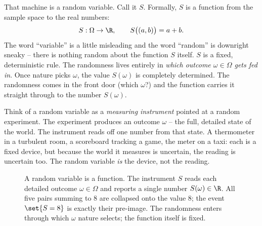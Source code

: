 That machine is a random variable. Call it $S$. Formally, $S$ is a function from the
sample space to the real numbers:
\[
  S : \Omega \to \R, \qquad S\big((a,b)\big) = a + b.
\]
The word ``variable'' is a little misleading and the word ``random'' is downright
sneaky -- there is nothing random about the function $S$ itself. $S$ is a fixed,
deterministic rule. The randomness lives entirely in \emph{which outcome
$\omega \in \Omega$ gets fed in}. Once nature picks $\omega$, the value $S(\omega)$ is
completely determined. The randomness comes in the front door (which $\omega$?) and
the function carries it straight through to the number $S(\omega)$.

\begin{intuitionbox}
Think of a random variable as a \emph{measuring instrument} pointed at a random
experiment. The experiment produces an outcome $\omega$ -- the full, detailed state of
the world. The instrument reads off one number from that state. A thermometer in a
turbulent room, a scoreboard tracking a game, the meter on a taxi: each is a fixed
device, but because the world it measures is uncertain, the reading is uncertain too.
The random variable \emph{is} the device, not the reading.
\end{intuitionbox}

\begin{figure}[H]
\centering
{}
\caption{A random variable is a function. The instrument $S$ reads each detailed
outcome $\omega\in\Omega$ and reports a single number $S(\omega)\in\R$. All five
pairs summing to $8$ are collapsed onto the value $8$; the event $\set{S=8}$ is exactly
their pre-image. The randomness enters through which $\omega$ nature selects; the
function itself is fixed.}
\label{ch06:fig-rv-map}
\end{figure}

